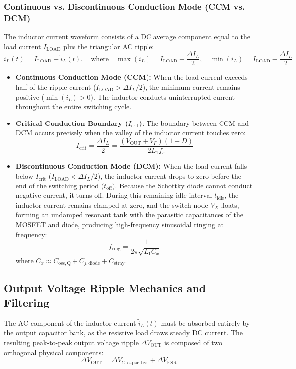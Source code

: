 \documentclass[12pt,a4paper]{article}
\newcommand{\Vout}{V_{\mathrm{OUT}}}
\newcommand{\Vx}{V_X}
\newcommand{\Iload}{I_{\mathrm{LOAD}}}
\newcommand{\dI}{\Delta I_L}
\newcommand{\fs}{f_s}
\begin{document}
\subsubsection{Continuous vs. Discontinuous Conduction Mode (CCM vs. DCM)}
The inductor current waveform consists of a DC average component equal to the load current $\Iload$ plus the triangular AC ripple:
\begin{equation}
    i_L(t) = \Iload + \tilde{i}_L(t), \quad \text{where} \quad \max(i_L) = \Iload + \frac{\dI}{2}, \quad \min(i_L) = \Iload - \frac{\dI}{2}
\end{equation}
\begin{itemize}[leftmargin=1.5em]
    \item \textbf{Continuous Conduction Mode (CCM):} When the load current exceeds half of the ripple current ($\Iload > \dI / 2$), the minimum current remains positive ($\min(i_L) > 0$). The inductor conducts uninterrupted current throughout the entire switching cycle.
    \item \textbf{Critical Conduction Boundary ($I_{\mathrm{crit}}$):} The boundary between CCM and DCM occurs precisely when the valley of the inductor current touches zero:
    \begin{equation}
        I_{\mathrm{crit}} = \frac{\dI}{2} = \frac{(\Vout + V_F)(1 - D)}{2 L_1 \fs}
        \label{eq:icrit}
    \end{equation}
    \item \textbf{Discontinuous Conduction Mode (DCM):} When the load current falls below $I_{\mathrm{crit}}$ ($\Iload < \dI / 2$), the inductor current drops to zero before the end of the switching period ($t_{\mathrm{off}}$). Because the Schottky diode cannot conduct negative current, it turns off. During this remaining idle interval $t_{\mathrm{idle}}$, the inductor current remains clamped at zero, and the switch-node $\Vx$ floats, forming an undamped resonant tank with the parasitic capacitances of the MOSFET and diode, producing high-frequency sinusoidal ringing at frequency:
    \begin{equation}
        f_{\mathrm{ring}} = \frac{1}{2\pi \sqrt{L_1 C_x}}
        \label{eq:fring}
    \end{equation}
    where $C_x \approx C_{\mathrm{oss,Q}} + C_{j,\mathrm{diode}} + C_{\mathrm{stray}}$.
\end{itemize}

\subsection{Output Voltage Ripple Mechanics and Filtering}
The AC component of the inductor current $\tilde{i}_L(t)$ must be absorbed entirely by the output capacitor bank, as the resistive load draws steady DC current. The resulting peak-to-peak output voltage ripple $\Delta \Vout$ is composed of two orthogonal physical components:
\begin{equation}
    \Delta \Vout = \Delta V_{C,\mathrm{capacitive}} + \Delta V_{\mathrm{ESR}}
    \label{eq:ripple_components}
\end{equation}
\end{document}
